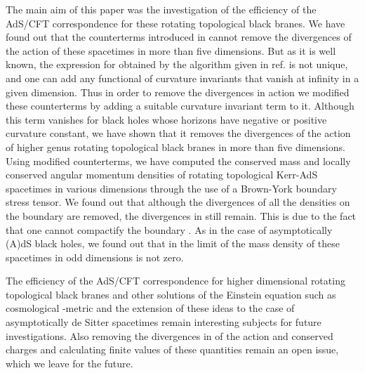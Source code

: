 \documentclass[a4paper,12pt,onecolumn]{revtex4}
\begin{document}
The main aim of this paper was the investigation of the efficiency of the
AdS/CFT correspondence for these rotating topological black branes. We have
found out that the counterterms introduced in \cite{Kls} cannot remove the \coordHE{} divergences of the action of these spacetimes in more than
five dimensions. But as it is well known, the expression for
\coordHE{} obtained by the algorithm given in ref. \cite{Kls} is not
unique, and one can add any functional of curvature invariants
that vanish at infinity in a given dimension. Thus in order to
remove the \coordHE{} divergences in action we modified these
counterterms by adding a suitable curvature invariant term to it.
Although this term vanishes for black holes whose horizons have
negative or positive curvature constant, we have shown that it
removes the divergences of the action of higher genus rotating
topological black branes in more than five dimensions. Using
modified counterterms, we have computed the conserved mass and
locally conserved angular momentum densities of rotating
topological Kerr-AdS spacetimes in various dimensions through the
use of a Brown-York boundary stress tensor. We found out that
although the \coordHE{} divergences of all the densities on the boundary
\coordHE{} are removed, the divergences in \myHighlight{$\chi $}\coordHE{}
still remain. This is due to the fact that one cannot compactify
the boundary \coordHE{}. As in the case of asymptotically (A)dS
black holes, we found out that in the limit of \coordHE{} the mass
density of these spacetimes in odd dimensions is not zero.

The efficiency of the AdS/CFT correspondence for higher
dimensional rotating topological black branes and other solutions
of the Einstein equation such as cosmological \coordHE{}-metric and the
extension of these ideas to the case of asymptotically de Sitter
spacetimes remain interesting subjects for future investigations.
Also removing the divergences in \myHighlight{$\chi $}\coordHE{} of the action and
conserved charges and calculating finite values of these
quantities remain an open issue, which we leave for the future.
\end{document}
